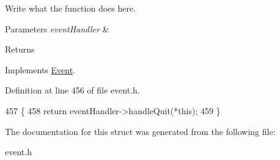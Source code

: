 Write what the function does here. 


\begin{DoxyParams}{Parameters}
{\em event\+Handler} & \\
\hline
\end{DoxyParams}
\begin{DoxyReturn}{Returns}

\end{DoxyReturn}


Implements \hyperlink{classEvent}{Event}.



Definition at line 456 of file event.\+h.


\begin{DoxyCode}
457     \{
458         \textcolor{keywordflow}{return} eventHandler->handleQuit(*\textcolor{keyword}{this});
459     \}
\end{DoxyCode}


The documentation for this struct was generated from the following file\+:\begin{DoxyCompactItemize}
\item 
event.\+h\end{DoxyCompactItemize}
